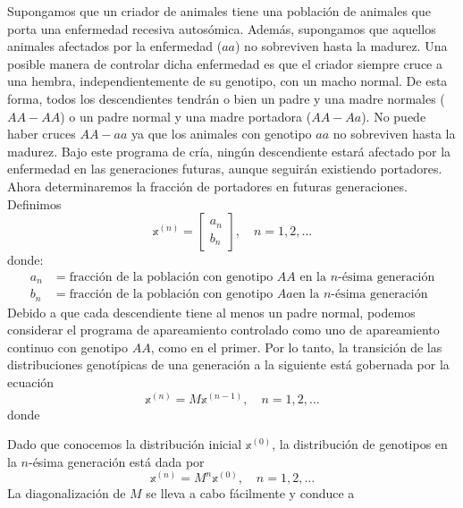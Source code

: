 Supongamos que un criador de animales tiene una población de animales que porta una enfermedad recesiva autosómica. Además, supongamos que aquellos animales afectados por la enfermedad ($aa$) no sobreviven hasta la madurez. Una posible manera de controlar dicha enfermedad es que el criador siempre cruce a una hembra, independientemente de su genotipo, con un macho normal. De esta forma, todos los descendientes tendrán o bien un padre y una madre normales ($AA - AA$) o un padre normal y una madre portadora ($AA - Aa$). No puede haber cruces $AA - aa$ ya que los animales con genotipo $aa$ no sobreviven hasta la madurez. Bajo este programa de cría, ningún descendiente estará afectado por la enfermedad en las generaciones futuras, aunque seguirán existiendo portadores. Ahora determinaremos la fracción de portadores en futuras generaciones. Definimos
$$\mathbb{x}^{(n)} = \begin{bmatrix}
    a_n \\
    b_n
\end{bmatrix}, \quad n = 1, 2, \dots$$
donde:
\begin{align*}
    a_n & = \text{fracción de la población con genotipo } AA \text{ en la } n\text{-ésima generación} \\
    b_n & = \text{fracción de la población con genotipo } Aa \text{en la } n\text{-ésima generación}
\end{align*}
Debido a que cada descendiente tiene al menos un padre normal, podemos considerar el programa de apareamiento controlado como uno de apareamiento continuo con genotipo $AA$, como en el primer. Por lo tanto, la transición de las distribuciones genotípicas de una generación a la siguiente está gobernada por la ecuación
$$\mathbb{x}^{(n)} = M \mathbb{x}^{(n-1)}, \quad n = 1, 2, \dots$$
donde
\begin{matrizn}
\end{matrizn}
Dado que conocemos la distribución inicial $\mathbb{x}^{(0)}$, la distribución de genotipos en la $n$-ésima generación está dada por
$$\mathbb{x}^{(n)} = M^n \mathbb{x}^{(0)}, \quad n = 1, 2, \dots$$
La diagonalización de $M$ se lleva a cabo fácilmente y conduce a
\begin{matrizn}
\end{matrizn}
